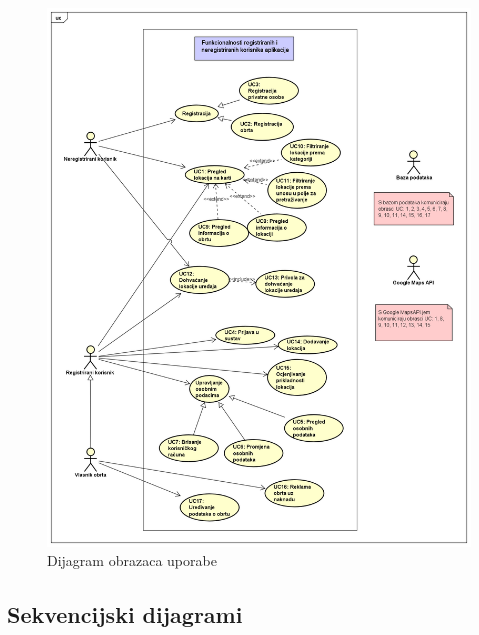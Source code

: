 					\begin{figure}[H]
						\includegraphics[scale=0.45]{slike/UseCaseDiagram2.png}
						\centering
						\caption{Dijagram obrazaca uporabe}
						\label{fig:promjene}
					\end{figure}
				\eject		
				
			\subsection{Sekvencijski dijagrami}
				
				
				
